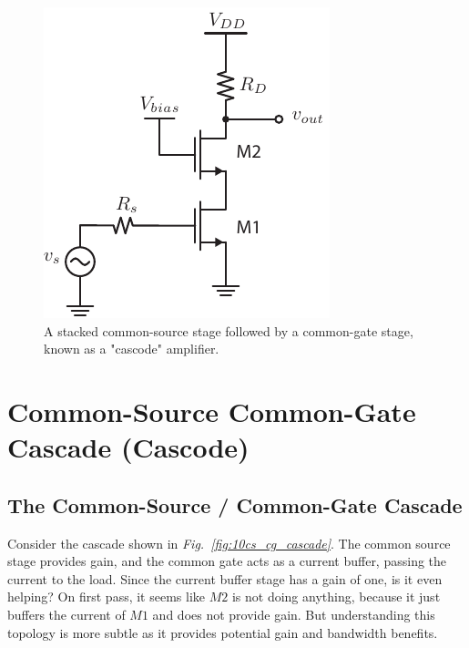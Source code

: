 \begin{figure}[H]
\centering
\includegraphics[scale=1.25]{10cascode_dc}
\caption{A stacked common-source stage followed by a common-gate stage, known as a "cascode" amplifier.}
\label{fig:10cascode_dc}
\end{figure}
\section{Common-Source Common-Gate Cascade (Cascode)}
\subsection{The Common-Source / Common-Gate Cascade}
Consider the cascade shown in \emph{Fig.~\ref{fig:10cs_cg_cascade}}.  The common source stage provides gain, and the common gate acts as a current buffer, passing the current to the load.  Since the current buffer stage has a gain of one, is it even helping?  On first pass, it seems like $M2$ is not doing anything, because it just buffers the current of $M1$ and does not provide gain.  But understanding this topology is more subtle as it provides potential gain and bandwidth benefits.
